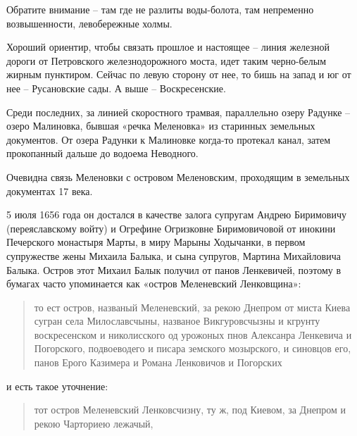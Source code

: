 Обратите внимание – там где не разлиты воды-болота, там непременно возвышенности, левобережные холмы.

Хороший ориентир, чтобы связать прошлое и настоящее – линия железной дороги от Петровского железнодорожного моста, идет таким черно-белым жирным пунктиром. Сейчас по левую сторону от нее, то бишь на запад и юг от нее – Русановские сады. А выше – Воскресенские.

Среди последних, за линией скоростного трамвая, параллельно озеру Радунке – озеро Малиновка, бывшая «речка Меленовка» из старинных земельных документов. От озера Радунки к Малиновке когда-то протекал канал, затем прокопанный дальше до водоема Неводного.



Очевидна связь Меленовки с островом Меленовским, проходящим в земельных документах 17 века.

5 июля 1656 года он достался в качестве залога супругам Андрею Биримовичу (переяславскому войту) и Огрефине Огризковне Биримовичовой от инокини Печерского монастыря Марты, в миру Марыны Ходычанки, в первом супружестве жены Михаила Балыка, и сына супругов, Мартина Михайловича Балыка. Остров этот Михаил Балык получил от панов Ленкевичей, поэтому в бумагах часто упоминается как «остров Меленевский Ленковщина»\cite{mihdocs}:

\begin{quotation}
то ест остров, названый Меленевский, за рекою Днепром от миста Киева сугран села Милославсчыны, названое Викгуровсчызны и кгрунту воскресенском и николисского од урожоных пнов Алексанра Ленкевича и Погорского, подвоеводего и писара земского мозырского, и синовцов его, панов Ерого Казимера и Романа Ленковичов и Погорских
\end{quotation}

и есть такое уточнение:

\begin{quotation}
тот остров Меленевский Ленковсчизну, ту ж, под Киевом, за Днепром и рекою Чарториею лежачый,
\end{quotation}

